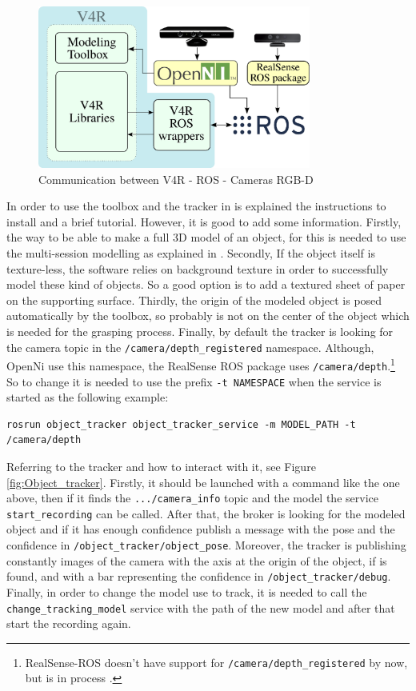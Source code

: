 \documentclass[12pt,a4paper,final,twoside,openright]{report}
\begin{document}
\begin{figure}[h]
\centering
\includegraphics[width=0.8\textwidth]{images/V4R-ROS.eps}
\caption{Communication between V4R - ROS - Cameras RGB-D\label{fig:V4R-ROS}}
\end{figure}

\vspace{-5pt}
In order to use the toolbox and the tracker in \cite{gitV4RWrappers} is explained the instructions to install and a brief tutorial. However, it is good to add some information. Firstly, the way to be able to make a full 3D model of an object, for this is needed to use the multi-session modelling as explained in \cite{Prankl2015b}. Secondly, If the object itself is texture-less, the software relies on background texture in order to  successfully  model  these  kind  of  objects. So a good option is to add a textured sheet of paper on the supporting surface. Thirdly, the origin of the modeled object is posed automatically by the toolbox, so probably is not on the center of the object which is needed for the grasping process. Finally, by default the tracker is looking for the camera topic in the \texttt{/camera/depth\_registered} namespace. Although, OpenNi use this namespace, the RealSense ROS package uses \texttt{/camera/depth}.\footnote{RealSense-ROS doesn't have support for \texttt{/camera/depth\_registered} by now, but is in process \cite{gitRealSense}.} So to change it is needed to use the prefix \texttt{-t NAMESPACE} when the service is started as the following example:

\begin{lstlisting}[language=ROS]
rosrun object_tracker object_tracker_service -m MODEL_PATH -t /camera/depth
\end{lstlisting}

Referring to the tracker and how to interact with it, see Figure \ref{fig:Object_tracker}. Firstly, it should be launched with a command like the one above, then if it finds the \texttt{.../camera\_info} topic and the model the service \texttt{start\_recording} can be called. After that, the broker is looking for the modeled object and if it has enough confidence publish a message with the pose and the confidence in \texttt{/object\_tracker/object\_pose}. Moreover, the tracker is publishing constantly images of the camera with the axis at the origin of the object, if is found, and with a bar representing the confidence in \texttt{/object\_tracker/debug}. Finally, in order to change the model use to track, it is needed to call the \texttt{change\_tracking\_model} service with the path of the new model and after that start the recording again.
\end{document}
